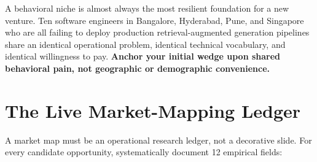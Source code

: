 A behavioral niche is almost always the most resilient foundation for a new venture. Ten software engineers in Bangalore, Hyderabad, Pune, and Singapore who are all failing to deploy production retrieval-augmented generation pipelines share an identical operational problem, identical technical vocabulary, and identical willingness to pay. \textbf{Anchor your initial wedge upon shared behavioral pain, not geographic or demographic convenience.}

\section{The Live Market-Mapping Ledger}

A market map must be an operational research ledger, not a decorative slide. For every candidate opportunity, systematically document 12 empirical fields:

